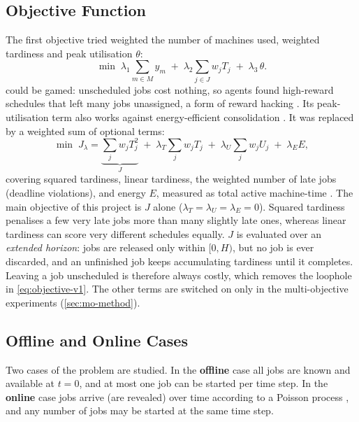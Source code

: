 \documentclass[12pt]{article}
\begin{document}
\subsection{Objective Function}\label{sec:objectives}
The first objective tried weighted the number of machines used, weighted tardiness and peak utilisation $\theta$:
\begin{equation}\label{eq:objective-v1}
    \min \; \lambda_1 \sum_{m \in M} y_m \;+\; \lambda_2 \sum_{j \in J} w_j T_j \;+\; \lambda_3\, \theta.
\end{equation}
 could be gamed: unscheduled jobs cost nothing, so agents found high-reward schedules that left many jobs unassigned, a form of reward hacking \cite{skalse2022rewardhacking}. Its peak-utilisation term also works against energy-efficient consolidation \cite{energyaware2012, fan2007powerprovisioning}. It was replaced by a weighted sum of optional terms:
\begin{equation}\label{eq:objective-v2}
    \min \; J_{\lambda} = \underbrace{\sum_{j} w_j T_j^{2}}_{J}
          \;+\; \lambda_T \sum_{j} w_j T_j
          \;+\; \lambda_U \sum_{j} w_j U_j
          \;+\; \lambda_E E,
\end{equation}
covering squared tardiness, linear tardiness, the weighted number of late jobs (deadline violations), and energy $E$, measured as total active machine-time \cite{fan2007powerprovisioning}. The main objective of this project is $J$ alone ($\lambda_T = \lambda_U = \lambda_E = 0$). Squared tardiness penalises a few very late jobs more than many slightly late ones, whereas linear tardiness can score very different schedules equally. $J$ is evaluated over an \emph{extended horizon}: jobs are released only within $[0, H)$, but no job is ever discarded, and an unfinished job keeps accumulating tardiness until it completes. Leaving a job unscheduled is therefore always costly, which removes the loophole in \cref{eq:objective-v1}. The other terms are switched on only in the multi-objective experiments (\cref{sec:mo-method}).

\subsection{Offline and Online Cases}\label{sec:cases}
Two cases of the problem are studied. In the \textbf{offline} case all jobs are known and available at $t = 0$, and at most one job can be started per time step. In the \textbf{online} case jobs arrive (are revealed) over time according to a Poisson process \cite{kleinrock1975queueing, mao2016deeprm}, and any number of jobs may be started at the same time step.
\end{document}
